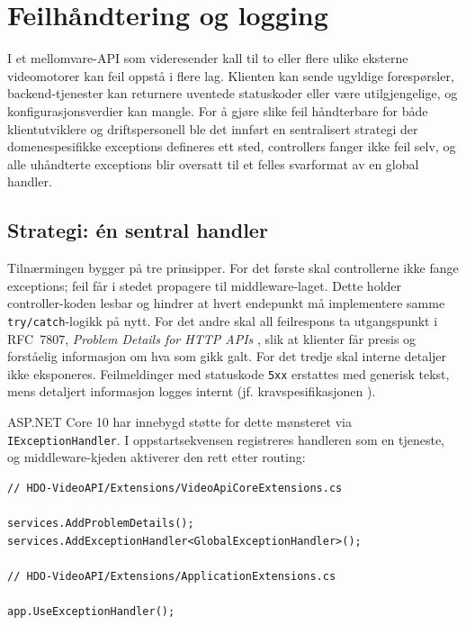 \section{Feilhåndtering og logging}
\label{sec:errors}

I et mellomvare-API som videresender kall til to eller flere ulike eksterne videomotorer kan feil oppstå i flere lag. Klienten kan sende ugyldige forespørsler, backend-tjenester kan returnere uventede statuskoder eller være utilgjengelige, og konfigurasjonsverdier kan mangle. For å gjøre slike feil håndterbare for både klientutviklere og driftspersonell ble det innført en sentralisert strategi der domenespesifikke exceptions defineres ett sted, controllers fanger ikke feil selv, og alle uhåndterte exceptions blir oversatt til et felles svarformat av en global handler.

\subsection{Strategi: én sentral handler}
\label{subsec:errors-strategi}

Tilnærmingen bygger på tre prinsipper. For det første skal controllerne ikke fange exceptions; feil får i stedet propagere til middleware-laget. Dette holder controller-koden lesbar og hindrer at hvert endepunkt må implementere samme \texttt{try/catch}-logikk på nytt. For det andre skal all feilrespons ta utgangspunkt i RFC~7807, \emph{Problem Details for HTTP APIs} \cite{rfc7807}, slik at klienter får presis og forståelig informasjon om hva som gikk galt. For det tredje skal interne detaljer ikke eksponeres. Feilmeldinger med statuskode \texttt{5xx} erstattes med generisk tekst, mens detaljert informasjon logges internt (jf. kravspesifikasjonen \cite{hdo_kravspec}).

ASP.NET Core 10 har innebygd støtte for dette mønsteret via \texttt{IExceptionHandler}. I oppstartsekvensen registreres handleren som en tjeneste, og middleware-kjeden aktiverer den rett etter routing:

\begin{lstlisting}[language={[Sharp]C}, caption={Registrering av den globale feil-handleren.}, label={lst:register-handler}]
// HDO-VideoAPI/Extensions/VideoApiCoreExtensions.cs

services.AddProblemDetails();
services.AddExceptionHandler<GlobalExceptionHandler>();

// HDO-VideoAPI/Extensions/ApplicationExtensions.cs

app.UseExceptionHandler();
\end{lstlisting}

